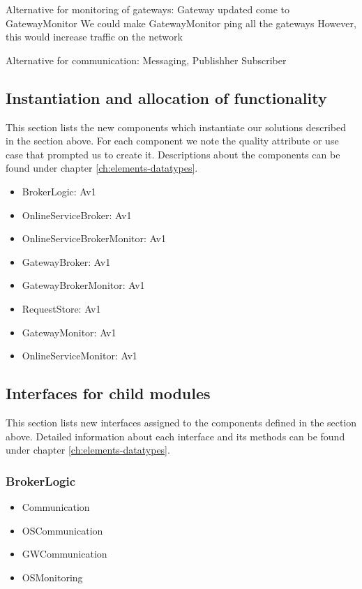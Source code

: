     Alternative for monitoring of gateways:
        Gateway updated come to GatewayMonitor
        We could make GatewayMonitor ping all the gateways
        However, this would increase traffic on the network

    Alternative for communication:
        Messaging, Publishher Subscriber


\subsection{Instantiation and allocation of functionality}
    This section lists the new components which instantiate our solutions
    described in the section above. For each component we note the quality
    attribute or use case that prompted us to create it. Descriptions about
    the components can be found under chapter \ref{ch:elements-datatypes}. \\

    \begin{itemize}
        \item BrokerLogic: Av1
        \item OnlineServiceBroker: Av1
        \item OnlineServiceBrokerMonitor: Av1
        \item GatewayBroker: Av1
        \item GatewayBrokerMonitor: Av1
        \item RequestStore: Av1
        \item GatewayMonitor: Av1
        \item OnlineServiceMonitor: Av1
    \end{itemize}


\subsection{Interfaces for child modules}
    This section lists new interfaces assigned to the components defined
    in the section above. Detailed information about each interface and
    its methods can be found under chapter \ref{ch:elements-datatypes}. \\

    \subsubsection{BrokerLogic}
        \begin{itemize}
            \item Communication
            \item OSCommunication
            \item GWCommunication
            \item OSMonitoring
        \end{itemize}

